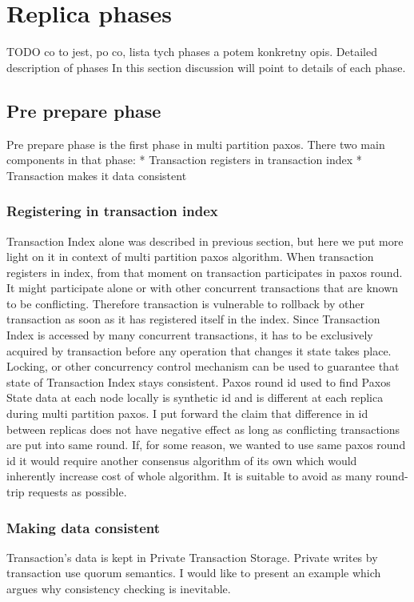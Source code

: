 \section{Replica phases}
TODO co to jest, po co, lista tych phases a potem konkretny opis.
        Detailed description of phases
In this section discussion will point to details of each phase.


\subsection{Pre prepare phase}
Pre prepare phase is the first phase in multi partition paxos. There two main components in that phase:
* Transaction registers in transaction index 
* Transaction makes it data consistent


\subsubsection{Registering in transaction index}
Transaction Index alone was described in previous section, but here we put more light on it in context of multi partition paxos algorithm. When transaction registers in index, from that moment on transaction participates in paxos round. It might participate alone or with other concurrent transactions that are known to be conflicting. Therefore transaction is vulnerable to rollback by other transaction as soon as it has registered itself in the index.
        Since Transaction Index is accessed by many concurrent transactions, it has to be exclusively acquired by transaction before any operation that changes it state takes place. Locking, or other concurrency control mechanism can be used to guarantee that state of Transaction Index stays consistent.
        Paxos round id used to find Paxos State data at each node locally is synthetic id and is different at each replica during multi partition paxos. I put forward the claim that difference in id between replicas does not have negative effect as long as conflicting transactions are put into same round. If, for some reason, we wanted to use same paxos round id it would require another consensus algorithm of its own which would inherently increase cost of whole algorithm. It is suitable to avoid as many round-trip requests as possible.
        
\subsubsection{Making data consistent}
Transaction’s data is kept in Private Transaction Storage. Private writes by transaction use quorum semantics. I would like to present an example which argues why consistency checking is inevitable.


